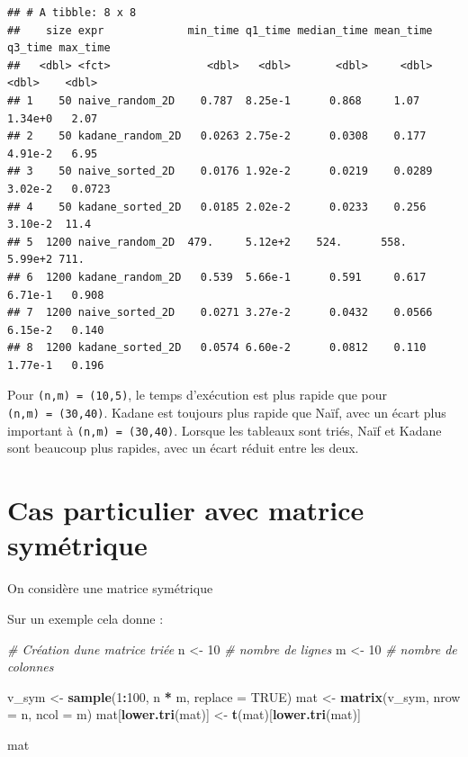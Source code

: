 \documentclass[
]{article}
\newenvironment{Shaded}{\begin{snugshade}}{\end{snugshade}}
\newcommand{\AttributeTok}[1]{\textcolor[rgb]{0.13,0.29,0.53}{#1}}
\newcommand{\CommentTok}[1]{\textcolor[rgb]{0.56,0.35,0.01}{\textit{#1}}}
\newcommand{\ConstantTok}[1]{\textcolor[rgb]{0.56,0.35,0.01}{#1}}
\newcommand{\DecValTok}[1]{\textcolor[rgb]{0.00,0.00,0.81}{#1}}
\newcommand{\FunctionTok}[1]{\textcolor[rgb]{0.13,0.29,0.53}{\textbf{#1}}}
\newcommand{\NormalTok}[1]{#1}
\newcommand{\OtherTok}[1]{\textcolor[rgb]{0.56,0.35,0.01}{#1}}
\newcommand{\SpecialCharTok}[1]{\textcolor[rgb]{0.81,0.36,0.00}{\textbf{#1}}}
\begin{document}
\begin{verbatim}
## # A tibble: 8 x 8
##    size expr             min_time q1_time median_time mean_time q3_time max_time
##   <dbl> <fct>               <dbl>   <dbl>       <dbl>     <dbl>   <dbl>    <dbl>
## 1    50 naive_random_2D    0.787  8.25e-1      0.868     1.07   1.34e+0   2.07  
## 2    50 kadane_random_2D   0.0263 2.75e-2      0.0308    0.177  4.91e-2   6.95  
## 3    50 naive_sorted_2D    0.0176 1.92e-2      0.0219    0.0289 3.02e-2   0.0723
## 4    50 kadane_sorted_2D   0.0185 2.02e-2      0.0233    0.256  3.10e-2  11.4   
## 5  1200 naive_random_2D  479.     5.12e+2    524.      558.     5.99e+2 711.    
## 6  1200 kadane_random_2D   0.539  5.66e-1      0.591     0.617  6.71e-1   0.908 
## 7  1200 naive_sorted_2D    0.0271 3.27e-2      0.0432    0.0566 6.15e-2   0.140 
## 8  1200 kadane_sorted_2D   0.0574 6.60e-2      0.0812    0.110  1.77e-1   0.196
\end{verbatim}

Pour \texttt{(n,m)\ =\ (10,5)}, le temps d'exécution est plus rapide que
pour \texttt{(n,m)\ =\ (30,40)}. Kadane est toujours plus rapide que
Naïf, avec un écart plus important à \texttt{(n,m)\ =\ (30,40)}. Lorsque
les tableaux sont triés, Naïf et Kadane sont beaucoup plus rapides, avec
un écart réduit entre les deux.

\section{Cas particulier avec matrice
symétrique}\label{cas-particulier-avec-matrice-symuxe9trique}

On considère une matrice symétrique

Sur un exemple cela donne :

\begin{Shaded}
\begin{Highlighting}[]
\CommentTok{\# Création d\textquotesingle{}une matrice triée}
\NormalTok{n }\OtherTok{\textless{}{-}} \DecValTok{10}  \CommentTok{\# nombre de lignes}
\NormalTok{m }\OtherTok{\textless{}{-}} \DecValTok{10}  \CommentTok{\# nombre de colonnes}

\NormalTok{v\_sym }\OtherTok{\textless{}{-}} \FunctionTok{sample}\NormalTok{(}\DecValTok{1}\SpecialCharTok{:}\DecValTok{100}\NormalTok{, n }\SpecialCharTok{*}\NormalTok{ m, }\AttributeTok{replace =} \ConstantTok{TRUE}\NormalTok{)}
\NormalTok{mat }\OtherTok{\textless{}{-}} \FunctionTok{matrix}\NormalTok{(v\_sym, }\AttributeTok{nrow =}\NormalTok{ n, }\AttributeTok{ncol =}\NormalTok{ m)}
\NormalTok{mat[}\FunctionTok{lower.tri}\NormalTok{(mat)] }\OtherTok{\textless{}{-}} \FunctionTok{t}\NormalTok{(mat)[}\FunctionTok{lower.tri}\NormalTok{(mat)]}
  
\NormalTok{mat}
\end{Highlighting}
\end{Shaded}
\end{document}
